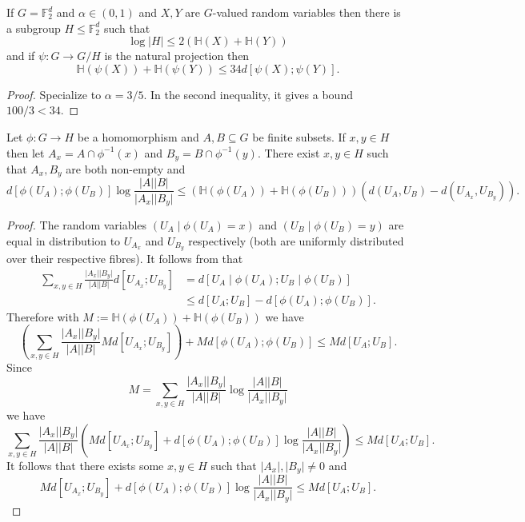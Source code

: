 \begin{lemma}\label{pfr-projection}\leanok
If $G=\mathbb{F}_2^d$ and $\alpha\in (0,1)$ and $X,Y$ are $G$-valued random
variables then there is a subgroup $H\leq \mathbb{F}_2^d$ such that
\[\log \lvert H\rvert \leq 2 (\mathbb{H}(X)+\mathbb{H}(Y))\]
and if $\psi:G \to G/H$ is the natural projection then
\[\mathbb{H}(\psi(X))+\mathbb{H}(\psi(Y))\leq 34 d[\psi(X);\psi(Y)].\]
\end{lemma}
\begin{proof}
\leanok
Specialize  to $\alpha=3/5$. In the second
inequality, it gives a bound $100/3 < 34$.
\end{proof}



\begin{lemma}\label{single-fibres}\leanok
Let $\phi:G\to H$ be a homomorphism and $A,B\subseteq G$ be finite subsets. If $x,y\in H$ then let $A_x=A\cap \phi^{-1}(x)$ and $B_y=B\cap \phi^{-1}(y)$. There exist $x,y\in H$ such that $A_x,B_y$ are both non-empty and
\[d[\phi(U_A);\phi(U_B)]\log \frac{\lvert A\rvert\lvert B\rvert}{\lvert A_x\rvert\lvert B_y\rvert}\leq (\mathbb{H}(\phi(U_A))+\mathbb{H}(\phi(U_B)))(d(U_A,U_B)-d(U_{A_x},U_{B_y})).\]
\end{lemma}
\begin{proof}
\leanok
The random variables $(U_A\mid \phi(U_A)=x)$ and $(U_B\mid \phi(U_B)=y)$ are equal in distribution to $U_{A_x}$ and $U_{B_y}$ respectively (both are uniformly distributed over their respective fibres). It follows from  that
\begin{align*}
\sum_{x,y\in H}\frac{\lvert A_x\rvert\lvert B_y\rvert}{\lvert A\rvert\lvert B\rvert}d[U_{A_x};U_{B_y}]
&=d[U_A\mid \phi(U_A); U_B\mid \phi(U_B)]\\
&\leq d[U_A;U_B]-d[\phi(U_A);\phi(U_B)].
\end{align*}
Therefore with $M:=\mathbb{H}(\phi(U_A))+\mathbb{H}(\phi(U_B))$ we have
\[\left(\sum_{x,y\in H}\frac{\lvert A_x\rvert\lvert B_y\rvert}{\lvert A\rvert\lvert B\rvert}Md[U_{A_x};U_{B_y}]\right)+Md[\phi(U_A);\phi(U_B)]\leq Md[U_A;U_B].\]
Since
\[M=\sum_{x,y\in H}\frac{\lvert A_x\rvert\lvert B_y\rvert}{\lvert A\rvert\lvert B\rvert}\log \frac{\lvert A\rvert\lvert B\rvert}{\lvert A_x\rvert\lvert B_y\rvert}\]
we have
\[\sum_{x,y\in H} \frac{\lvert A_x\rvert\lvert B_y\rvert}{\lvert A\rvert\lvert B\rvert}\left(Md[U_{A_x};U_{B_y}]+d[\phi(U_A);\phi(U_B)]\log \frac{\lvert A\rvert\lvert B\rvert}{\lvert A_x\rvert\lvert B_y\rvert}\right)\leq  Md[U_A;U_B].\]
It follows that there exists some $x,y\in H$ such that $\lvert A_x\rvert,\lvert B_y\rvert\neq 0$ and
\[Md[U_{A_x};U_{B_y}]+d[\phi(U_A);\phi(U_B)]\log \frac{\lvert A\rvert\lvert B\rvert}{\lvert A_x\rvert\lvert B_y\rvert}\leq  Md[U_A;U_B].\]
\end{proof}


